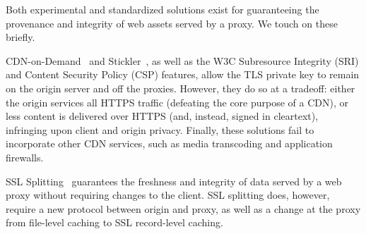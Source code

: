 Both experimental and standardized solutions exist for guaranteeing the
provenance and integrity of web assets served by a proxy.
We touch on these briefly.
%

CDN-on-Demand~\cite{cdn-on-demand} and Stickler~\cite{stickler}, as well as the
W3C Subresource Integrity (SRI) and Content Security Policy (CSP) features,
allow the TLS private key to remain on the origin server and off the proxies.
However, they do so at a tradeoff: either the origin services all HTTPS traffic
(defeating the core purpose of a CDN), or less content is delivered over HTTPS
(and, instead, signed in cleartext), infringing upon client and origin privacy.
%
Finally, these solutions fail to incorporate other CDN services, such as media
transcoding and application firewalls.

SSL Splitting~\cite{ssl-splitting} guarantees the freshness and integrity of
data served by a web proxy without requiring changes to the client.
%
%
%
%
%
%
SSL splitting does, however, require a new protocol between origin and proxy, as
well as a change at the proxy from file-level caching to SSL record-level
caching.


